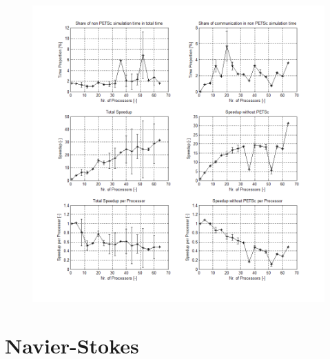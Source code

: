 \documentclass[11pt,a4paper]{article}
\begin{document}
\begin{figure}[h]
  \centering
  \includegraphics[width=\textwidth]{scaling/channel-strong}
  \caption{}
  \label{fig:scaling-channel-strong}
\end{figure}

\section{Navier-Stokes}
\end{document}
